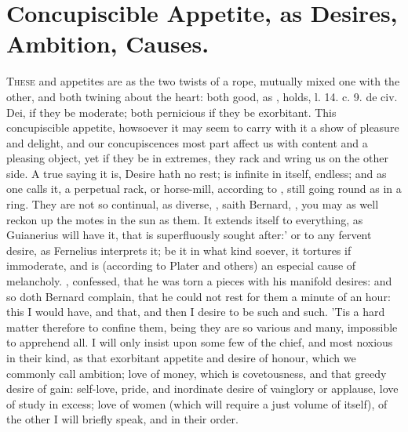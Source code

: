 {{%
\section{Concupiscible Appetite, as Desires, Ambition, Causes.}

\lettrine{T}{hese}  and  appetites are as the two twists of a
rope, mutually mixed one with the other, and both twining about the
heart: both good, as \Austin{}, holds, l. 14. c. 9. de civ. Dei, if
they be moderate; both pernicious if they be exorbitant. This
concupiscible appetite, howsoever it may seem to carry with it a show
of pleasure and delight, and our concupiscences most part affect us
with content and a pleasing object, yet if they be in extremes, they
rack and wring us on the other side. A true saying it is, Desire hath
no rest; is infinite in itself, endless; and as one calls it, a
perpetual rack, or horse-mill, according to \Austin{}, still going
round as in a ring. They are not so continual, as diverse, , saith Bernard, , you may as well reckon up the motes in the sun
as them. It extends itself to everything, as Guianerius will have
it, that is superfluously sought after:' or to any fervent
desire, as Fernelius interprets it; be it in what kind soever, it
tortures if immoderate, and is (according to Plater and others)
an especial cause of melancholy. , \Austin{} confessed, that he was torn a pieces
with his manifold desires: and so doth Bernard complain, that he
could not rest for them a minute of an hour: this I would have, and
that, and then I desire to be such and such. 'Tis a hard matter
therefore to confine them, being they are so various and many,
impossible to apprehend all. I will only insist upon some few of the
chief, and most noxious in their kind, as that exorbitant appetite and
desire of honour, which we commonly call ambition; love of money, which
is covetousness, and that greedy desire of gain: self-love, pride, and
inordinate desire of vainglory or applause, love of study in excess;
love of women (which will require a just volume of itself), of the
other I will briefly speak, and in their order.

}}
